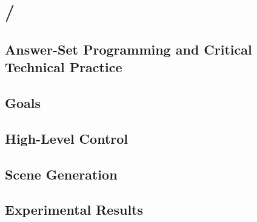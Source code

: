 \chapter{\dunyazad/}

\label{ch:dunyazad}

\section{Answer-Set Programming and Critical Technical Practice}

\section{Goals}

\section{High-Level Control}

\section{Scene Generation}

\section{Experimental Results}
